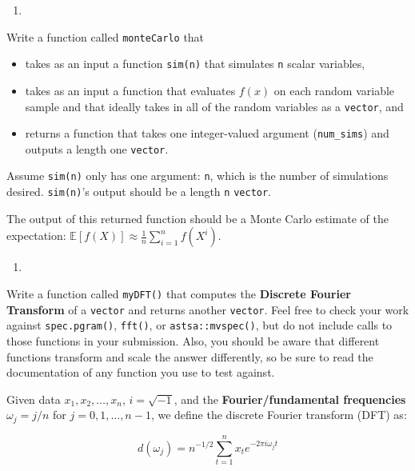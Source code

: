 \documentclass[
  12pt,
]{krantz}
\providecommand{\tightlist}{%
  \setlength{\itemsep}{0pt}\setlength{\parskip}{0pt}}
\begin{document}
\begin{enumerate}
\def\labelenumi{\arabic{enumi}.}
\setcounter{enumi}{1}
\tightlist
\item
\end{enumerate}

Write a function called \texttt{monteCarlo} that

\begin{itemize}
\tightlist
\item
  takes as an input a function \texttt{sim(n)} that simulates \texttt{n} scalar variables,\\
\item
  takes as an input a function that evaluates \(f(x)\) on each random variable sample and that ideally takes in all of the random variables as a \texttt{vector}, and
\item
  returns a function that takes one integer-valued argument (\texttt{num\_sims}) and outputs a length one \texttt{vector}.
\end{itemize}

Assume \texttt{sim(n)} only has one argument: \texttt{n}, which is the number of simulations desired. \texttt{sim(n)}'s output should be a length \texttt{n} \texttt{vector}.

The output of this returned function should be a Monte Carlo estimate of the expectation: \(\mathbb{E}[f(X)] \approx \frac{1}{n}\sum_{i=1}^n f(X^i)\).

\begin{enumerate}
\def\labelenumi{\arabic{enumi}.}
\setcounter{enumi}{2}
\tightlist
\item
\end{enumerate}

Write a function called \texttt{myDFT()} that computes the \textbf{Discrete Fourier Transform} of a \texttt{vector} and returns another \texttt{vector}. Feel free to check your work against \texttt{spec.pgram()}, \texttt{fft()}, or \texttt{astsa::mvspec()}, but do not include calls to those functions in your submission. Also, you should be aware that different functions transform and scale the answer differently, so be sure to read the documentation of any function you use to test against.

Given data \(x_1,x_2,\ldots,x_n\), \(i = \sqrt{-1}\), and the \textbf{Fourier/fundamental frequencies} \(\omega_j= j/n\) for \(j=0,1,\ldots,n-1\), we define the discrete Fourier transform (DFT) as:

\begin{equation} \label{eq:DFT}
d(\omega_j)= n^{-1/2} \sum_{t=1}^n x_t e^{-2 \pi i \omega_j t}
\end{equation}
\end{document}
